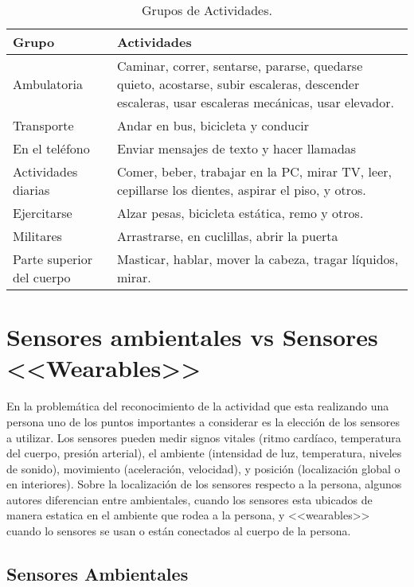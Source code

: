 \begin{table}[htbp]
	\begin{center}
		\begin{tabular}{|l|p{9cm}|}
			\hline
			\textbf{Grupo} & \textbf{Actividades} \\
			\hline \hline
			Ambulatoria & Caminar, correr, sentarse, pararse, quedarse quieto, acostarse, subir escaleras, descender escaleras, usar escaleras mecánicas, usar elevador.\\ \hline
			Transporte & Andar en bus, bicicleta y conducir \\ \hline
			En el teléfono & Enviar mensajes de texto y hacer llamadas \\ \hline
			Actividades diarias & Comer, beber, trabajar en la PC, mirar TV, leer, cepillarse los dientes, aspirar el piso, y otros. \\ \hline
			Ejercitarse & Alzar pesas, bicicleta estática, remo y otros. \\ \hline
			Militares & Arrastrarse, en cuclillas, abrir la puerta \\ \hline
			Parte superior del cuerpo & Masticar, hablar, mover la cabeza, tragar líquidos, mirar. \\ \hline
		\end{tabular}
		\caption{Grupos de Actividades.}
		\label{tabla:sencilla}
	\end{center}
\end{table}


\section{Sensores ambientales vs Sensores <<Wearables>>}

En la problemática del reconocimiento de la actividad que esta realizando una persona uno de los puntos importantes a considerar es la elección de los sensores a utilizar. Los sensores pueden medir signos vitales (ritmo cardíaco, temperatura del cuerpo, presión arterial), el ambiente (intensidad de luz, temperatura, niveles de sonido), movimiento (aceleración, velocidad), y posición (localización global o en interiores).
Sobre la localización de los sensores respecto a la persona, algunos autores \cite{ReyesOrtiz2015} diferencian entre ambientales, cuando los sensores esta ubicados de manera estatica en el ambiente que rodea a la persona, y <<wearables>> cuando lo sensores se usan o están conectados al cuerpo de la persona.

\subsection{Sensores Ambientales}


